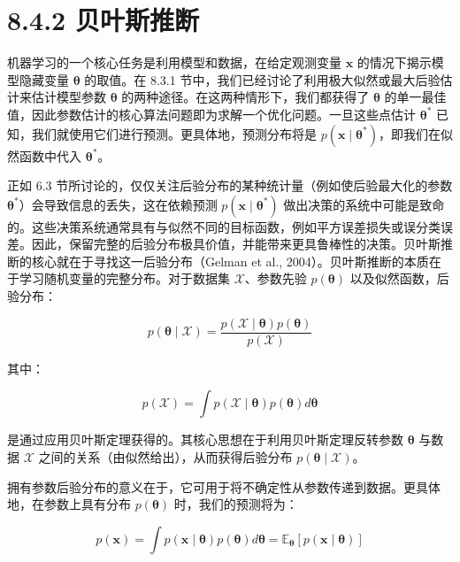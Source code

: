 \section*{8.4.2 贝叶斯推断}

机器学习的一个核心任务是利用模型和数据，在给定观测变量 $ \boldsymbol{x} $ 的情况下揭示模型隐藏变量 $ \boldsymbol{\theta} $ 的取值。在 8.3.1 节中，我们已经讨论了利用极大似然或最大后验估计来估计模型参数 $ \boldsymbol{\theta} $ 的两种途径。在这两种情形下，我们都获得了 $ \boldsymbol{\theta} $ 的单一最佳值，因此参数估计的核心算法问题即为求解一个优化问题。一旦这些点估计 $ \boldsymbol{\theta}^* $ 已知，我们就使用它们进行预测。更具体地，预测分布将是 $ p(\boldsymbol{x} \mid \boldsymbol{\theta}^*) $，即我们在似然函数中代入 $ \boldsymbol{\theta}^* $。

正如 6.3 节所讨论的，仅仅关注后验分布的某种统计量（例如使后验最大化的参数 $ \boldsymbol{\theta}^* $）会导致信息的丢失，这在依赖预测 $ p(\boldsymbol{x} \mid \boldsymbol{\theta}^*) $ 做出决策的系统中可能是致命的。这些决策系统通常具有与似然不同的目标函数，例如平方误差损失或误分类误差。因此，保留完整的后验分布极具价值，并能带来更具鲁棒性的决策。贝叶斯推断的核心就在于寻找这一后验分布（Gelman et al., 2004）。贝叶斯推断的本质在于学习随机变量的完整分布。对于数据集 $ \mathcal{X} $、参数先验 $ p(\boldsymbol{\theta}) $ 以及似然函数，后验分布：

\begin{equation}
p(\boldsymbol{\theta} \mid \mathcal{X}) = \frac{p(\mathcal{X} \mid \boldsymbol{\theta}) p(\boldsymbol{\theta})}{p(\mathcal{X})}
\tag{8.22}\label{eq:8-22}
\end{equation}

其中：

\begin{equation*}
p(\mathcal{X}) = \int p(\mathcal{X} \mid \boldsymbol{\theta}) p(\boldsymbol{\theta}) d\boldsymbol{\theta}
\end{equation*}

是通过应用贝叶斯定理获得的。其核心思想在于利用贝叶斯定理反转参数 $ \boldsymbol{\theta} $ 与数据 $ \mathcal{X} $ 之间的关系（由似然给出），从而获得后验分布 $ p(\boldsymbol{\theta} \mid \mathcal{X}) $。

拥有参数后验分布的意义在于，它可用于将不确定性从参数传递到数据。更具体地，在参数上具有分布 $ p(\boldsymbol{\theta}) $ 时，我们的预测将为：

\begin{equation}
p(\boldsymbol{x}) = \int p(\boldsymbol{x} \mid \boldsymbol{\theta}) p(\boldsymbol{\theta}) d\boldsymbol{\theta} = \mathbb{E}_{\boldsymbol{\theta}}[p(\boldsymbol{x} \mid \boldsymbol{\theta})]
\tag{8.23}\label{eq:8-23}
\end{equation}


